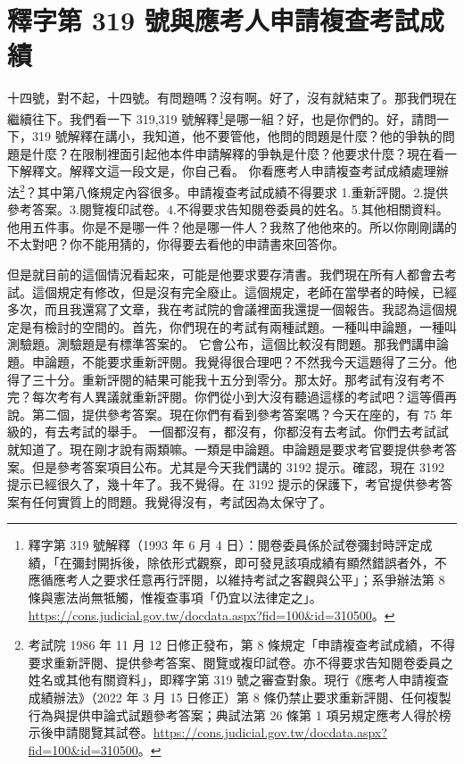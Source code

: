 \section{釋字第 319 號與應考人申請複查考試成績}

\hypertarget{c08:cue:143}{}十四號，對不起，十四號。有問題嗎？沒有啊。好了，沒有就結束了。那我們現在繼續往下。我們看一下 319,319 號解釋\footnote{釋字第 319 號解釋（1993 年 6 月 4 日）：閱卷委員係於試卷彌封時評定成績，「在彌封開拆後，除依形式觀察，即可發見該項成績有顯然錯誤者外，不應循應考人之要求任意再行評閱，以維持考試之客觀與公平」；系爭辦法第 8 條與憲法尚無牴觸，惟複查事項「仍宜以法律定之」。\url{https://cons.judicial.gov.tw/docdata.aspx?fid=100&id=310500}。}是哪一組？好，也是你們的。好，請問一下，319 號解釋在講小，我知道，他不要管他，他問的問題是什麼？他的爭執的問題是什麼？在限制裡面引起他本件申請解釋的爭執是什麼？他要求什麼？現在看一下解釋文。解釋文這一段文是，你自己看。
\hypertarget{c08:cue:144}{}你看應考人申請複查考試成績處理辦法\footnote{考試院 1986 年 11 月 12 日修正發布，第 8 條規定「申請複查考試成績，不得要求重新評閱、提供參考答案、閱覽或複印試卷。亦不得要求告知閱卷委員之姓名或其他有關資料」，即釋字第 319 號之審查對象。現行《應考人申請複查成績辦法》（2022 年 3 月 15 日修正）第 8 條仍禁止要求重新評閱、任何複製行為與提供申論式試題參考答案；典試法第 26 條第 1 項另規定應考人得於榜示後申請閱覽其試卷。\url{https://cons.judicial.gov.tw/docdata.aspx?fid=100&id=310500}。}？其中第八條規定內容很多。申請複查考試成績不得要求 1.重新評閱。2.提供參考答案。3.閱覽複印試卷。4.不得要求告知閱卷委員的姓名。5.其他相關資料。他用五件事。你是不是哪一件？他是哪一件人？我熬了他他來的。所以你剛剛講的不太對吧？你不能用猜的，你得要去看他的申請書來回答你。

\hypertarget{c08:cue:145}{}但是就目前的這個情況看起來，可能是他要求要存清書。我們現在所有人都會去考試。這個規定有修改，但是沒有完全廢止。這個規定，老師在當學者的時候，已經多次，而且我還寫了文章，我在考試院的會議裡面我還提一個報告。我認為這個規定是有檢討的空間的。首先，你們現在的考試有兩種試題。一種叫申論題，一種叫測驗題。測驗題是有標準答案的。
\hypertarget{c08:cue:146}{}它會公布，這個比較沒有問題。那我們講申論題。申論題，不能要求重新評閱。我覺得很合理吧？不然我今天這題得了三分。他得了三十分。重新評閱的結果可能我十五分到零分。那太好。那考試有沒有考不完？每次考有人異議就重新評閱。你們從小到大沒有聽過這樣的考試吧？這等價再說。第二個，提供參考答案。現在你們有看到參考答案嗎？今天在座的，有 75 年級的，有去考試的舉手。
\hypertarget{c08:cue:147}{}一個都沒有，都沒有，你都沒有去考試。你們去考試試就知道了。現在剛才說有兩類嘛。一類是申論題。申論題是要求考官要提供參考答案。但是參考答案項目公布。尤其是今天我們講的 3192 提示。確認，現在 3192 提示已經很久了，幾十年了。我不覺得。在 3192 提示的保護下，考官提供參考答案有任何實質上的問題。我覺得沒有，考試因為太保守了。

